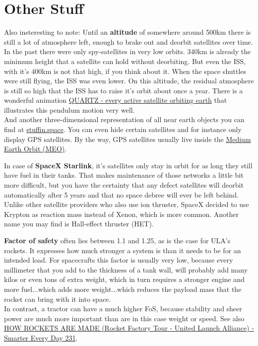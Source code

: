 \documentclass[12pt,paper=A4,numbers=noenddot,bibliography=totoc,listof=totoc,DIV=11,BCOR=1mm]{scrreprt}
\begin{document}
\section{Other Stuff}
Also insteresting to note: Until an \textbf{altitude} of somewhere around 500km there is still a lot of atmosphere left, enough to brake out and deorbit satellites over time. In the past there were only spy-satellites in very low orbits. 340km is already the minimum height that a satellite can hold without deorbiting.
But even the ISS, with it's 400km is not that high, if you think about it. When the space shuttles were still flying, the ISS was even lower. On this altitude, the residual atmosphere is still so high that the ISS has to raise it's orbit about once a year. There is a wonderful animation \href{https://qz.com/296941/interactive-graphic-every-active-satellite-orbiting-earth/}{QUARTZ - every active satellite orbiting earth} that illustrates this pendulum motion very well.\\
And another three-dimensional representation of all near earth objects you can find at \href{http://stuffin.space/}{stuffin.space}. You can even hide certain satellites and for instance only display GPS satellites. By the way, GPS satellites usually live inside the \href{https://en.wikipedia.org/wiki/Medium_Earth_orbit}{Medium Earth Orbit (MEO)}.

In case of \textbf{SpaceX Starlink}, it's satellites only stay in orbit for as long they still have fuel in their tanks. That makes maintenance of those networks a little bit more difficult, but you have the certainty that any defect satellites will deorbit automatically after 5 years and that no space debree will ever be left behind.
Unlike other satellite providers who also use ion thruster, SpaceX decided to use Krypton as reaction mass instead of Xenon, which is more common. Another name you may find is Hall-effect thruster (HET).

\textbf{Factor of safety} often lies between 1.1 and 1.25, as is the case for ULA's rockets.
It expresses how much stronger a system is than it needs to be for an intended load.
For spacecrafts this factor is usually very low, because every millimeter that you add to the thickness of a tank wall, will probably add many kilos or even tons of extra weight, which in turn requires a stronger engine and more fuel...which adds more weight...which reduces the payload mass that the rocket can bring with it into space.\\
In contrast, a tractor can have a much higher FoS, because stability and sheer power are much more important  than are in this case weight or speed. See also \href{https://youtu.be/o0fG_lnVhHw}{HOW ROCKETS ARE MADE (Rocket Factory Tour - United Launch Alliance) - Smarter Every Day 231}.
\end{document}
